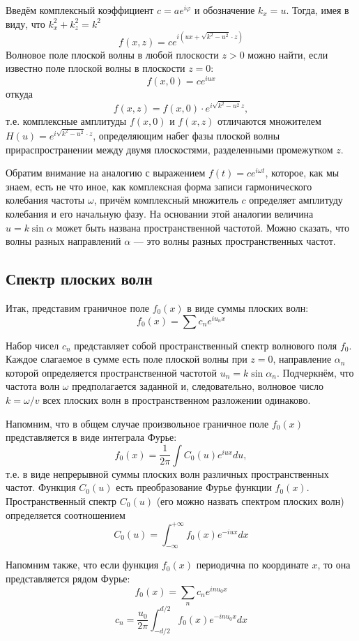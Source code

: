 Введём комплексный коэффициент $c = ae^{i\varphi}$ и обозначение $k_x = u$. Тогда, имея в виду, что $k_x^2 + k_z^2 = k^2$
\[
f(x, z) = ce^{i(ux + \sqrt{k^2 - u^2}\cdot z)}
\]
Волновое поле плоской волны в любой плоскости $z > 0$ можно найти, если известно поле плоской волны в плоскости $z=0$:
\[
    f(x, 0) = ce^{iux}
\]
откуда
\[
    f(x, z) = f(x, 0)\cdot e^{i\sqrt{k^2-u^2}z},
\]
т.е. комплексные амплитуды $f(x, 0)$ и $f(x, z)$  отличаются множителем $H(u) = e^{i\sqrt{k^2 - u^2}\cdot z}$,  определяющим набег фазы плоской волны прираспространении между двумя плоскостями, разделенными промежутком $z$.

Обратим внимание на аналогию с выражением $f(t) = ce^{i\omega t}$, которое, как мы знаем, есть не что иное, как комплексная форма записи гармонического колебания частоты $\omega$, причём комплексный множитель $c$ определяет амплитуду колебания и его начальную фазу. На основании этой аналогии величина $u=k\sin\alpha$  может быть названа пространственной частотой. Можно сказать, что волны разных направлений $\alpha$ --- это волны разных пространственных частот.

\subsection{Спектр плоских волн}
Итак, представим граничное поле $f_0(x)$ в виде суммы плоских волн:
\[
f_0(x) = \sum c_n e^{iu_nx}
\]

Набор чисел $c_n$ представляет собой пространственный спектр волнового поля $f_0$.  Каждое слагаемое в сумме есть поле плоской волны при $z=0$, направление $\alpha_n$ которой определяется пространственной частотой $u_n = k\sin\alpha_n$.  Подчеркнём, что частота волн $\omega$ предполагается заданной и, следовательно, волновое число$k = \omega / v$ всех плоских волн в пространственном разложении одинаково.

Напомним, что в общем случае произвольное граничное поле $f_0(x)$ представляется в виде интеграла Фурье:
\[
f_0(x) = \frac{1}{2\pi}\int C_0 (u) e^{iux} du,
\]
т.е. в виде непрерывной суммы плоских волн различных пространственных частот. Функция $C_0(u)$ есть преобразование Фурье функции $f_0(x)$. Пространственный спектр $C_0(u)$ (его можно назвать спектром плоских волн) определяется соотношением
\[
    C_0(u) = \int_{-\infty}^{+\infty} f_0(x)e^{-iux}dx
\]

Напомним также, что если функция $f_0(x)$ периодична по координате $x$, то она представляется рядом Фурье:
\[
    f_0(x) = \sum_n c_n e^{inu_0x}
\]
\[
    c_n = \frac{u_0}{2\pi}\int_{-d/2}^{d/2} f_0(x)e^{-inu_0x}dx
\]

